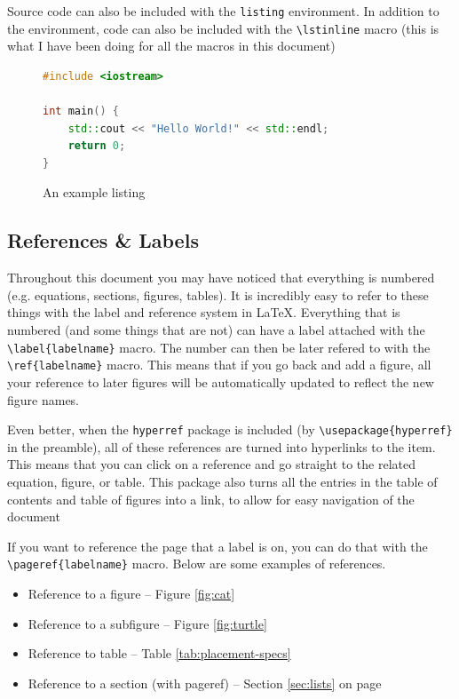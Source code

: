 \documentclass{article}
\begin{document}
Source code can also be included with the \lstinline{listing} environment. In addition to the environment, code can also be included with the \lstinline{\lstinline} macro (this is what I have been doing for all the macros in this document)

\begin{figure}
\caption{An example listing}
\begin{lstlisting}[language=c++,keywordstyle=\color{blue}]
#include <iostream>

int main() {
    std::cout << "Hello World!" << std::endl;
    return 0;
}
\end{lstlisting}
\end{figure}

\subsection{References \& Labels}
Throughout this document you may have noticed that everything is numbered (e.g. equations, sections, figures, tables). It is incredibly easy to refer to these things with the label and reference system in \LaTeX{}. Everything that is numbered (and some things that are not) can have a label attached with the \lstinline|\label{labelname}| macro. The number can then be later refered to with the \lstinline|\ref{labelname}| macro. This means that if you go back and add a figure, all your reference to later figures will be automatically updated to reflect the new figure names.

Even better, when the \lstinline{hyperref} package is included (by \lstinline|\usepackage{hyperref}| in the preamble), all of these references are turned into hyperlinks to the item. This means that you can click on a reference and go straight to the related equation, figure, or table. This package also turns all the entries in the table of contents and table of figures into a link, to allow for easy navigation of the document

If you want to reference the page that a label is on, you can do that with the \lstinline|\pageref{labelname}| macro.
Below are some examples of references.
\begin{itemize}
  \item Reference to a figure -- Figure \ref{fig:cat}
  \item Reference to a subfigure -- Figure \ref{fig:turtle}
  \item Reference to table -- Table \ref{tab:placement-specs}
  \item Reference to a section (with pageref) -- Section \ref{sec:lists} on page \pageref{sec:lists}
\end{itemize}
\end{document}
